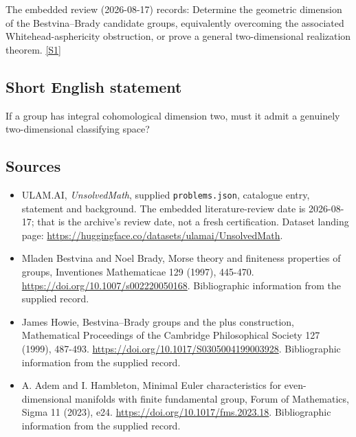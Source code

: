 \documentclass[11pt,a4paper]{article}
\newcommand{\sref}[2]{\hyperlink{source:#1:#2}{[S#2]}}
\begin{document}
The embedded review (2026-08-17) records: Determine the geometric dimension of the Bestvina--Brady candidate groups, equivalently overcoming the associated Whitehead-asphericity obstruction, or prove a general two-dimensional realization theorem. \sref{statement}{1}

\subsection{Short English statement}

If a group has integral cohomological dimension two, must it admit a genuinely two-dimensional classifying space?

\subsection{Sources}

{\small

\begin{itemize}

\item[\hypertarget{source:statement:1}{S1}] ULAM.AI, \emph{UnsolvedMath}, supplied \texttt{problems.json}, catalogue entry, statement and background. The embedded literature-review date is 2026-08-17; that is the archive’s review date, not a fresh certification. Dataset landing page: \url{https://huggingface.co/datasets/ulamai/UnsolvedMath}.

\item[\hypertarget{source:statement:2}{S2}] Mladen Bestvina and Noel Brady, Morse theory and finiteness properties of groups, Inventiones Mathematicae 129 (1997), 445-470. \url{https://doi.org/10.1007/s002220050168}. Bibliographic information from the supplied record.

\item[\hypertarget{source:statement:3}{S3}] James Howie, Bestvina--Brady groups and the plus construction, Mathematical Proceedings of the Cambridge Philosophical Society 127 (1999), 487-493. \url{https://doi.org/10.1017/S0305004199003928}. Bibliographic information from the supplied record.

\item[\hypertarget{source:statement:4}{S4}] A. Adem and I. Hambleton, Minimal Euler characteristics for even-dimensional manifolds with finite fundamental group, Forum of Mathematics, Sigma 11 (2023), e24. \url{https://doi.org/10.1017/fms.2023.18}. Bibliographic information from the supplied record.

\end{itemize}

}

\label{end:statement}
\end{document}
